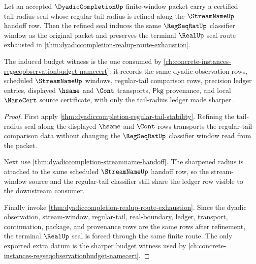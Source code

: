 \begin{theorem}
\label{thm:dyadiccompletion-regular-tail-budget-refinement}
Let an accepted $\DyadicCompletionUp$ finite-window packet carry a certified
tail-radius seal whose regular-tail radius is refined along the
$\StreamNameUp$ handoff row. Then the refined seal induces the same
$\RegSeqRatUp$ classifier window as the original packet and preserves the
terminal $\RealUp$ seal route exhausted in
\autoref{thm:dyadiccompletion-realup-route-exhaustion}.

The induced budget witness is the one consumed by
\autoref{ch:concrete-instances-regseqobservationbudget-namecert}: it records
the same dyadic observation rows, scheduled $\StreamNameUp$ windows,
regular-tail comparison rows, precision ledger entries, displayed $\hsame$ and
$\Cont$ transports, $\mathsf{Pkg}$ provenance, and local $\NameCert$ source
certificate, with only the tail-radius ledger made sharper.
\end{theorem}
\begin{proof}
First apply
\autoref{thm:dyadiccompletion-regular-tail-stability}. Refining the
tail-radius seal along the displayed $\hsame$ and $\Cont$ rows transports the
regular-tail comparison data without changing the $\RegSeqRatUp$ classifier
window read from the packet.

Next use \autoref{thm:dyadiccompletion-streamname-handoff}. The sharpened
radius is attached to the same scheduled $\StreamNameUp$ handoff row, so the
stream-window source and the regular-tail classifier still share the ledger row
visible to the downstream consumer.

Finally invoke \autoref{thm:dyadiccompletion-realup-route-exhaustion}. Since
the dyadic observation, stream-window, regular-tail, real-boundary, ledger,
transport, continuation, package, and provenance rows are the same rows after
refinement, the terminal $\RealUp$ seal is forced through the same finite
route. The only exported extra datum is the sharper budget witness used by
\autoref{ch:concrete-instances-regseqobservationbudget-namecert}.
\end{proof}


